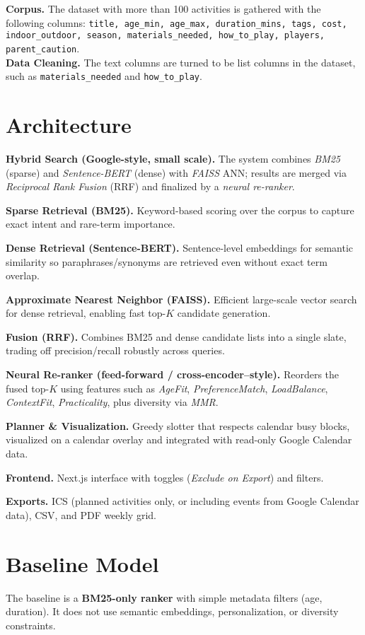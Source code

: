 \documentclass[final]{article}
\begin{document}
\textbf{Corpus.} The dataset with more than 100 activities is gathered with the following columns:  
\texttt{title, age\_min, age\_max, duration\_mins, tags, cost, indoor\_outdoor, season, materials\_needed, how\_to\_play, players, \\ parent\_caution}.  \\
\textbf{Data Cleaning.} The text columns are turned to be list columns in the dataset, such as \texttt{materials\_needed} and \texttt{how\_to\_play}.



\section*{Architecture}
\textbf{Hybrid Search (Google-style, small scale).} The system combines \emph{BM25} (sparse) and \emph{Sentence-BERT} (dense) with \emph{FAISS} ANN; results are merged via \emph{Reciprocal Rank Fusion} (RRF) and finalized by a \emph{neural re-ranker}.

\textbf{Sparse Retrieval (BM25).} Keyword-based scoring over the corpus to capture exact intent and rare-term importance.

\textbf{Dense Retrieval (Sentence-BERT).} Sentence-level embeddings for semantic similarity so paraphrases/synonyms are retrieved even without exact term overlap.

\textbf{Approximate Nearest Neighbor (FAISS).} Efficient large-scale vector search for dense retrieval, enabling fast top-$K$ candidate generation.

\textbf{Fusion (RRF).} Combines BM25 and dense candidate lists into a single slate, trading off precision/recall robustly across queries.

\textbf{Neural Re-ranker (feed-forward / cross-encoder–style).} Reorders the fused top-$K$ using features such as \emph{AgeFit}, \emph{PreferenceMatch}, \emph{LoadBalance}, \emph{ContextFit}, \emph{Practicality}, plus diversity via \emph{MMR}.

\textbf{Planner \& Visualization.} Greedy slotter that respects calendar busy blocks, visualized on a calendar overlay and integrated with read-only Google Calendar data.

\textbf{Frontend.} Next.js interface with toggles (\emph{Exclude on Export}) and filters.

\textbf{Exports.} ICS (planned activities only, or including events from Google Calendar data), CSV, and PDF weekly grid.


\section*{Baseline Model}
The baseline is a \textbf{BM25-only ranker} with simple metadata filters (age, duration). It does not use semantic embeddings, personalization, or diversity constraints.
\end{document}
